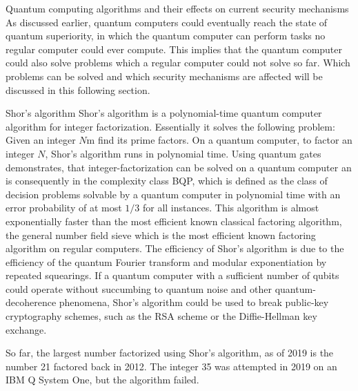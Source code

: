 \documentclass[aps,twocolumn,preprintnumbers]{revtex4}
\begin{document}
\begin{section}{Quantum computing algorithms and their effects on current security mechanisms}
As discussed earlier, quantum computers could eventually reach the state of quantum superiority, 
in which the quantum computer can perform tasks no regular computer could ever compute.
This implies that the quantum computer could also solve problems which a regular computer could not solve so far.
Which problems can be solved and which security mechanisms are affected will be discussed in this following section. 

\begin{subsection}{Shor's algorithm}
Shor's algorithm is a polynomial-time quantum computer algorithm for integer factorization.
Essentially it solves the following problem: 
Given an integer $N$m find its prime factors. 
On a quantum computer, to factor an integer $N$, 
Shor's algorithm runs in polynomial time. 
Using quantum gates demonstrates, 
that integer-factorization can be solved on a quantum computer an is consequently in the complexity class BQP, 
which is defined as the class of decision problems solvable by a quantum computer in polynomial time with an error probability of at most $1/3$ for all instances. 
This algorithm is almost exponentially faster than the most efficient known classical factoring algorithm, the general number field sieve which is the most efficient known factoring algorithm on regular computers. 
The efficiency of Shor's algorithm is due to the efficiency of the quantum Fourier transform and modular exponentiation by repeated squearings. 
If a quantum computer with a sufficient number of qubits could operate without succumbing to quantum noise and other quantum-decoherence phenomena, 
Shor's algorithm could be used to break public-key cryptography schemes, 
such as the RSA scheme or the Diffie-Hellman key exchange.

So far, the largest number factorized using Shor's algorithm, 
as of 2019 is the number 21 factored back in 2012. 
The integer 35 was attempted in 2019 on an IBM Q System One, 
but the algorithm failed. 

\end{subsection}


\end{section}
\end{document}
